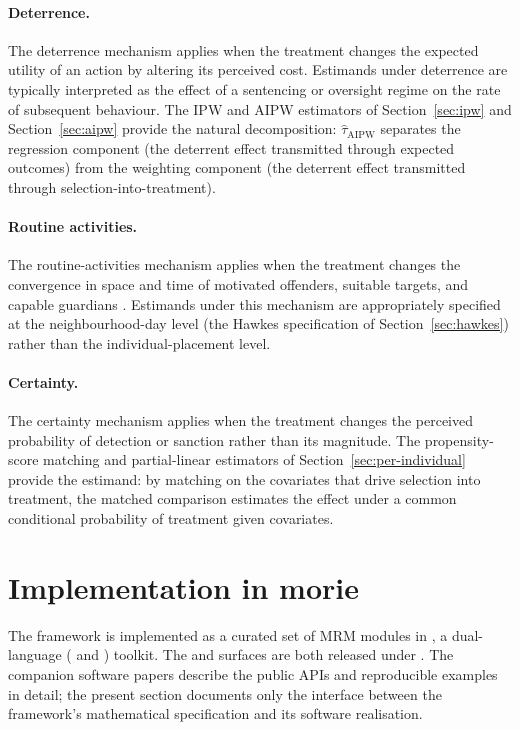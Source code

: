 \documentclass[article,shortnames,nojss]{jss}
\begin{document}
\paragraph{Deterrence.}
The deterrence mechanism applies when the treatment changes the
expected utility of an action by altering its perceived cost.
Estimands under deterrence are typically interpreted as the effect
of a sentencing or oversight regime on the rate of subsequent
behaviour. The IPW and AIPW estimators of Section~\ref{sec:ipw}
and Section~\ref{sec:aipw} provide the natural decomposition:
$\hat{\tau}_{\mathrm{AIPW}}$ separates the regression component
(the deterrent effect transmitted through expected outcomes) from
the weighting component (the deterrent effect transmitted through
selection-into-treatment).

\paragraph{Routine activities.}
The routine-activities mechanism applies when the treatment
changes the convergence in space and time of motivated offenders,
suitable targets, and capable guardians \citep{CohenFelson1979}.
Estimands under this mechanism are appropriately specified at the
neighbourhood-day level (the Hawkes specification of
Section~\ref{sec:hawkes}) rather than the individual-placement
level.

\paragraph{Certainty.}
The certainty mechanism applies when the treatment changes the
perceived probability of detection or sanction rather than its
magnitude. The propensity-score matching and partial-linear
estimators of Section~\ref{sec:per-individual} provide the
estimand: by matching on the covariates that drive selection
into treatment, the matched comparison estimates the effect under
a common conditional probability of treatment given covariates.

\section{Implementation in morie}
\label{sec:morie}

The framework is implemented as a curated set of MRM modules in
, a dual-language ( and )
toolkit.  The  and  surfaces are both released
under .  The
companion software papers
\citep{Ruhela2026MorieR, Ruhela2026MoriePy} describe the public
APIs and reproducible examples in detail; the present section
documents only the interface between the framework's mathematical
specification and its software realisation.
\end{document}
